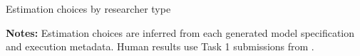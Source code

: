\begin{table}[!htbp]
\centering
\caption{Estimation choices by researcher type}
\label{tab:methods}
\small
\resizebox{\textwidth}{!}{}
\caption*{\footnotesize \textbf{Notes:} Estimation choices are inferred from each generated model specification and execution metadata. Human results use Task 1 submissions from \citet{huntingtonklein2025sources}.}
\end{table}
\FloatBarrier